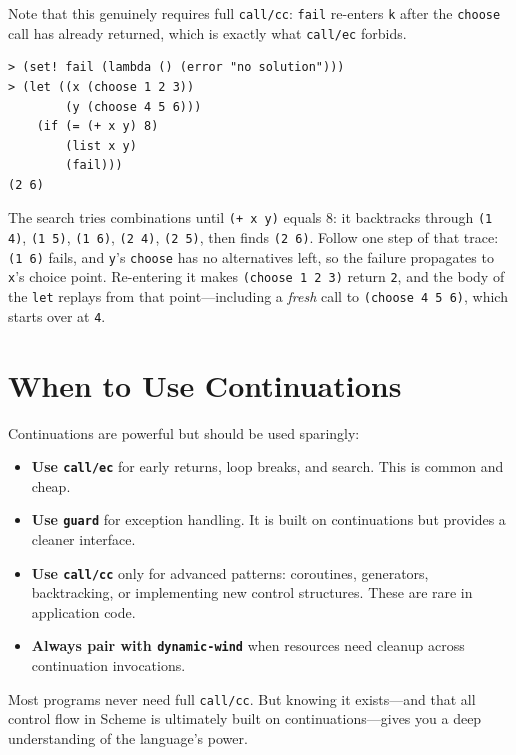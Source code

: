 Note that this genuinely requires full \texttt{call/cc}: \texttt{fail} re-enters \texttt{k} after the \texttt{choose} call has already returned, which is exactly what \texttt{call/ec} forbids.

\begin{lstlisting}[style=repl]
> (set! fail (lambda () (error "no solution")))
> (let ((x (choose 1 2 3))
        (y (choose 4 5 6)))
    (if (= (+ x y) 8)
        (list x y)
        (fail)))
(2 6)
\end{lstlisting}

The search tries combinations until \texttt{(+ x y)} equals 8: it backtracks through \texttt{(1 4)}, \texttt{(1 5)}, \texttt{(1 6)}, \texttt{(2 4)}, \texttt{(2 5)}, then finds \texttt{(2 6)}. Follow one step of that trace: \texttt{(1 6)} fails, and \texttt{y}'s \texttt{choose} has no alternatives left, so the failure propagates to \texttt{x}'s choice point. Re-entering it makes \texttt{(choose 1 2 3)} return \texttt{2}, and the body of the \texttt{let} replays from that point---including a \emph{fresh} call to \texttt{(choose 4 5 6)}, which starts over at \texttt{4}.

\section{When to Use Continuations}

Continuations are powerful but should be used sparingly:

\begin{itemize}
    \item \textbf{Use \texttt{call/ec}} for early returns, loop breaks, and search. This is common and cheap.
    \item \textbf{Use \texttt{guard}} for exception handling. It is built on continuations but provides a cleaner interface.
    \item \textbf{Use \texttt{call/cc}} only for advanced patterns: coroutines, generators, backtracking, or implementing new control structures. These are rare in application code.
    \item \textbf{Always pair with \texttt{dynamic-wind}} when resources need cleanup across continuation invocations.
\end{itemize}

Most programs never need full \texttt{call/cc}. But knowing it exists---and that all control flow in Scheme is ultimately built on continuations---gives you a deep understanding of the language's power.

